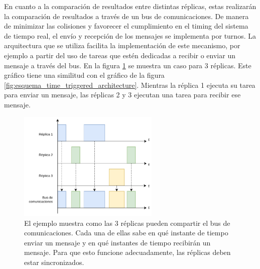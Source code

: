 

En cuanto a la comparación de resultados entre distintas réplicas, estas realizarán la comparación de resultados a través de un bus de comunicaciones. %
De manera de minimizar las colisiones y favorecer el cumplimiento en el timing del sistema de tiempo real, el envío y recepción de los mensajes se implementa por turnos. La arquitectura que se utiliza facilita la implementación de este mecanismo, por ejemplo a partir del uso de tareas que estén dedicadas a recibir o enviar un mensaje a través del bus. %
En la figura \ref{fig:TDMA_esquema} se muestra un caso para 3 réplicas. Este gráfico tiene una similitud con el gráfico de la figura \ref{fig:esquema_time_triggered_architecture}. Mientras la réplica 1 ejecuta su tarea para enviar un mensaje, las réplicas 2 y 3 ejecutan una tarea para recibir ese mensaje. 

\begin{figure}[!t]
    \centering
    \includegraphics[width=0.6\textwidth]{img/TDMA_esquema.png}
    \caption{El ejemplo muestra como las 3 réplicas pueden compartir el bus de comunicaciones. Cada una de ellas sabe en qué instante de tiempo enviar un mensaje y en qué instantes de tiempo recibirán un mensaje. Para que esto funcione adecuadamente, las réplicas deben estar sincronizados.}
    \label{fig:TDMA_esquema}
\end{figure}


